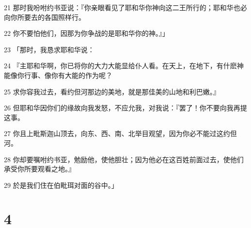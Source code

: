 \par 21 那时我吩咐约书亚说：『你亲眼看见了耶和华你神向这二王所行的；耶和华也必向你所要去的各国照样行。
\par 22 你不要怕他们，因那为你争战的是耶和华你的神。』」
\par 23 「那时，我恳求耶和华说：
\par 24 『主耶和华啊，你已将你的大力大能显给仆人看。在天上，在地下，有什麽神能像你行事、像你有大能的作为呢？
\par 25 求你容我过去，看约但河那边的美地，就是那佳美的山地和利巴嫩。』
\par 26 但耶和华因你们的缘故向我发怒，不应允我，对我说：『罢了！你不要向我再提这事。
\par 27 你且上毗斯迦山顶去，向东、西、南、北举目观望，因为你必不能过这约但河。
\par 28 你却要嘱咐约书亚，勉励他，使他胆壮；因为他必在这百姓前面过去，使他们承受你所要观看之地。』
\par 29 於是我们住在伯毗珥对面的谷中。」

\chapter{4}


